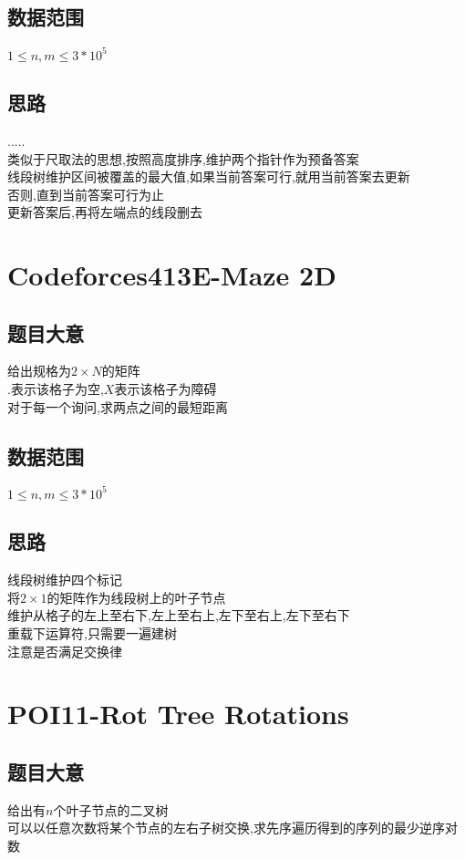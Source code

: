\documentclass{ctexart}
\numberwithin{equation}{section}
\begin{document}
\begin{flushleft}
  \subsection{数据范围}
  $1\le n,m\le 3*10^5$\\
  \subsection{思路}
  .....\\
  类似于尺取法的思想,按照高度排序,维护两个指针作为预备答案\\
  线段树维护区间被覆盖的最大值,如果当前答案可行,就用当前答案去更新\\
  否则,直到当前答案可行为止\\
  更新答案后,再将左端点的线段删去\\
  \newpage

  \section{Codeforces413E-Maze 2D}
  \subsection{题目大意}
  给出规格为$2\times N$的矩阵\\
  .\;表示该格子为空,\;$X$表示该格子为障碍\\
  对于每一个询问,求两点之间的最短距离\\
  \subsection{数据范围}
  $1\le n,m\le 3*10^5$\\
  \subsection{思路}
  线段树维护四个标记\\
  将$2\times 1$的矩阵作为线段树上的叶子节点\\
  维护从格子的左上至右下,左上至右上,左下至右上,左下至右下\\
  重载下运算符,只需要一遍建树\\
  注意是否满足交换律\\
  \newpage

  \section{POI11-Rot Tree Rotations}
  \subsection{题目大意}
  给出有$n$个叶子节点的二叉树\\
  可以以任意次数将某个节点的左右子树交换,求先序遍历得到的序列的最少逆序对数\\

\end{flushleft}
\end{document}
